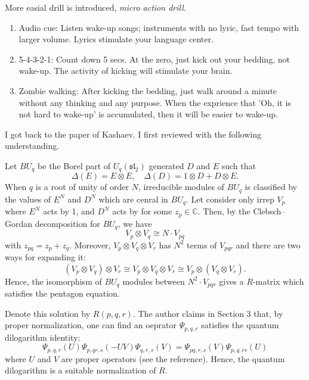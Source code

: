 \documentclass[11pt]{amsart}
\begin{document}
More easial drill is introduced, \emph{micro action drill}.
\begin{enumerate}
    \item Audio cue: Listen wake-up songs; instruments with no lyric, fast tempo with larger volume.
    Lyrics stimulate your language center.
    
    \item 5-4-3-2-1: Count down 5 secs.
    At the zero, just kick out your bedding, not wake-up.
    The activity of kicking will stimulate your brain.

    \item Zombie walking: After kicking the bedding, just walk around a minute without any thinking and any purpose.
    When the exprience that 'Oh, it is not hard to wake-up' is accumulated, then it will be easier to wake-up.
    
\end{enumerate}

\par\vspace{1em}

I got back to the paper of Kashaev.
I first reviewed \cite{Kashaev-1994-Qdilog6j} with the following understanding.

Let $BU_q$ be the Borel part of $U_q(\mathfrak{sl}_2)$ generated $D$ and $E$ such that
\[
    \Delta(E) = E \otimes E, \quad \Delta(D) = 1 \otimes D + D \otimes E.
\]  
When $q$ is a root of unity of order $N$, irreducible modules of $BU_q$ is classified by the values of $E^N$ and $D^N$ which are cenral in $BU_q$.
Let consider only irrep $V_p$ where $E^N$ acts by 1, and $D^N$ acts by for some $z_p \in \mathbb{C}$.
Then, by the Clebsch--Gordan decomposition for $BU_q$, we have
\[
    V_p \otimes V_q \cong N \cdot V_{pq}
\]
with $z_{pq} = z_p + z_q$.
Moreover, $V_p \otimes V_q \otimes V_r$ has $N^2$ terms of $V_{pqr}$ and there are two ways for expanding it:
\[
    (V_p \otimes V_q) \otimes V_r \cong V_p \otimes V_q \otimes V_r \cong V_p \otimes (V_q \otimes V_r).
\]
Hence, the isomorphism of $BU_q$ modules between $N^2 \cdot V_{pqr}$ gives a $R$-matrix which satisfies the pentagon equation.

Denote this solution by $R(p, q, r)$.
The author claims in Section 3 that, by proper normalization, one can find an oeprator $\Psi_{p, q, r}$ satisfies the quantum dilogarithm identity:
\[
    \Psi_{p,q,r}(U) \Psi_{p,qr,s}(-UV) \Psi_{q,r,s}(V) = \Psi_{pq,r,s}(V) \Psi_{p,q,rs}(U) 
\]
where $U$ and $V$ are proper operators (see the reference).
Hence, the quantum dilogarithm is a suitable normalization of $R$.
\end{document}

